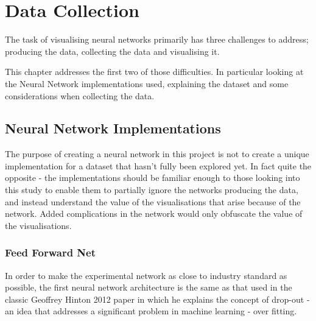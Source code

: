 \documentclass[a4paper,11pt,titlepage]{article}
\begin{document}
\clearpage
\section{Data Collection}
	
	The task of visualising neural networks primarily has three challenges to address; producing the data, collecting the data and visualising it. 
	\par 
	This chapter addresses the first two of those difficulties. In particular looking at the Neural Network implementations used, explaining the dataset and some considerations when collecting the data.
	
	\subsection{Neural Network Implementations}
	The purpose of creating a neural network in this project is not to create a unique implementation for a dataset that hasn't fully been explored yet. In fact quite the opposite - the implementations should be familiar enough to those looking into this study to enable them to partially ignore the networks producing the data, and instead understand the value of the visualisations that arise because of the network. Added complications in the network would only obfuscate the value of the visualisations. 
	
	\begin{figure}[H]
    			\caption{}%
	\end{figure}	


		\subsubsection{Feed Forward Net}

		In order to make the experimental network as close to industry standard as possible, the first neural network architecture is the same as that used in the classic Geoffrey Hinton 2012 paper in which he explains the concept of drop-out \cite{Hinton2012} - an idea that addresses a significant problem in machine learning - over fitting.
	
\end{document}
